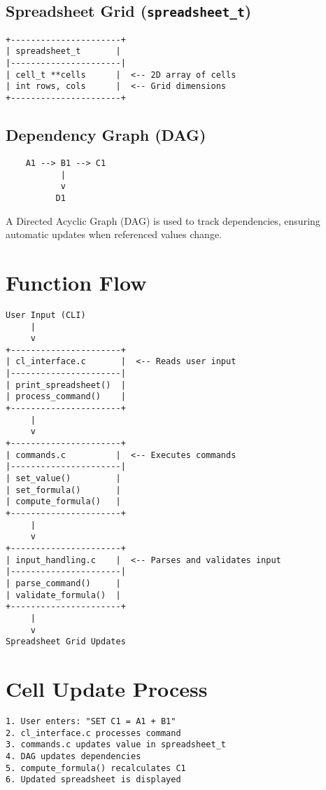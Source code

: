 \documentclass[a4paper,12pt]{article}
\begin{document}
\subsection{Spreadsheet Grid (\texttt{spreadsheet\_t})}
\begin{verbatim}
+----------------------+
| spreadsheet_t       |
|----------------------|
| cell_t **cells      |  <-- 2D array of cells
| int rows, cols      |  <-- Grid dimensions
+----------------------+
\end{verbatim}

\subsection{Dependency Graph (DAG)}
\begin{verbatim}
    A1 --> B1 --> C1
           |
           v
          D1
\end{verbatim}
A Directed Acyclic Graph (DAG) is used to track dependencies, ensuring automatic updates when referenced values change.

\section{Function Flow}
\begin{verbatim}
User Input (CLI)
     |
     v
+----------------------+
| cl_interface.c       |  <-- Reads user input
|----------------------|
| print_spreadsheet()  |
| process_command()    |
+----------------------+
     |
     v
+----------------------+
| commands.c          |  <-- Executes commands
|----------------------|
| set_value()         |
| set_formula()       |
| compute_formula()   |
+----------------------+
     |
     v
+----------------------+
| input_handling.c    |  <-- Parses and validates input
|----------------------|
| parse_command()     |
| validate_formula()  |
+----------------------+
     |
     v
Spreadsheet Grid Updates
\end{verbatim}

\section{Cell Update Process}
\begin{verbatim}
1. User enters: "SET C1 = A1 + B1"
2. cl_interface.c processes command
3. commands.c updates value in spreadsheet_t
4. DAG updates dependencies
5. compute_formula() recalculates C1
6. Updated spreadsheet is displayed
\end{verbatim}
\end{document}
